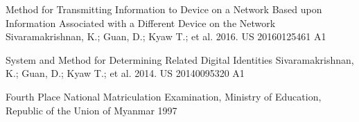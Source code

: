 

\begin{cvpatents}

  \cvpatent
    {Method for Transmitting Information to Device on a Network Based upon Information Associated with a Different Device on the Network} %
    {Sivaramakrishnan, K.; Guan, D.; Kyaw T.; et al. 2016.} %
    {US 20160125461 A1} %

  \cvpatent
    {System and Method for Determining Related Digital Identities} %
    {Sivaramakrishnan, K.; Guan, D.; Kyaw T.; et al. 2014.} %
    {US 20140095320 A1} %

  \cvpatent
    {Fourth Place} %
    {National Matriculation Examination, Ministry of Education, Republic of the Union of Myanmar} %
    {1997} %

\end{cvpatents}
